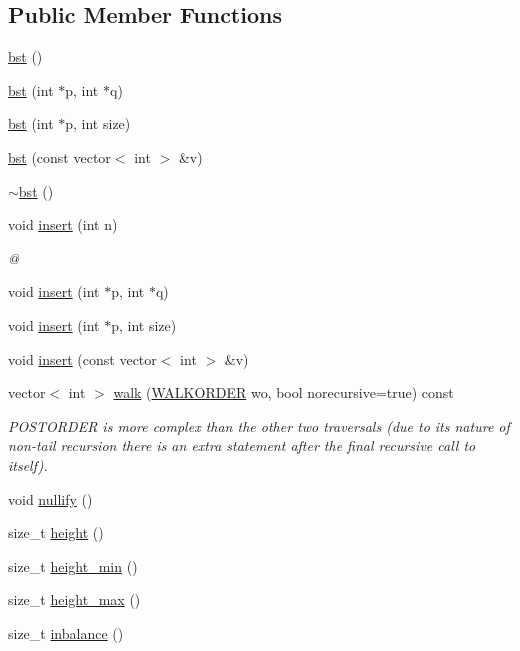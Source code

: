 \subsection*{Public Member Functions}
\begin{DoxyCompactItemize}
\item 
\hyperlink{classbst_a7e853bf07e80d1ca3f63147ca056885b}{bst} ()
\item 
\hyperlink{classbst_ac2d09618fef6c8771b13126271658650}{bst} (int $\ast$p, int $\ast$q)
\item 
\hyperlink{classbst_ab8c59af54f80760f70af65da6d9ed0b5}{bst} (int $\ast$p, int size)
\item 
\hyperlink{classbst_ad1de95dd42e0b0f7e068067517807768}{bst} (const vector$<$ int $>$ \&v)
\item 
\hyperlink{classbst_a4755b663e678f2207dc32caccb5bb18d}{$\sim$bst} ()
\item 
void \hyperlink{classbst_a843b0fe1972a0008170abed11e5d3968}{insert} (int n)
\begin{DoxyCompactList}\small\item\em @ \end{DoxyCompactList}\item 
void \hyperlink{classbst_af96154a8371024bffc9f157e7cde2967}{insert} (int $\ast$p, int $\ast$q)
\item 
void \hyperlink{classbst_a2221f83ef688d5ae829502c77f16fce1}{insert} (int $\ast$p, int size)
\item 
void \hyperlink{classbst_ac5f3349098823cc08e76f22b7e3be371}{insert} (const vector$<$ int $>$ \&v)
\item 
vector$<$ int $>$ \hyperlink{classbst_a9e8eceb111915919599c147e2d3b9fb0}{walk} (\hyperlink{bst_8h_ae70daad8be95b143e7f97f55e1c4e743}{W\-A\-L\-K\-O\-R\-D\-E\-R} wo, bool norecursive=true) const 
\begin{DoxyCompactList}\small\item\em P\-O\-S\-T\-O\-R\-D\-E\-R is more complex than the other two traversals (due to its nature of non-\/tail recursion there is an extra statement after the final recursive call to itself). \end{DoxyCompactList}\item 
void \hyperlink{classbst_a698bfef73902a195688efcdc0aad32d4}{nullify} ()
\item 
size\-\_\-t \hyperlink{classbst_a891aa44765d452e600b6f1be79b1a7d6}{height} ()
\item 
size\-\_\-t \hyperlink{classbst_a24751e37cedacf3be3a09385df994690}{height\-\_\-min} ()
\item 
size\-\_\-t \hyperlink{classbst_abee0b512bbaf837d3a7abbbf2b4db1f7}{height\-\_\-max} ()
\item 
size\-\_\-t \hyperlink{classbst_a4d6ee35a495f93588fa9a9a1219550f4}{inbalance} ()
\end{DoxyCompactItemize}
